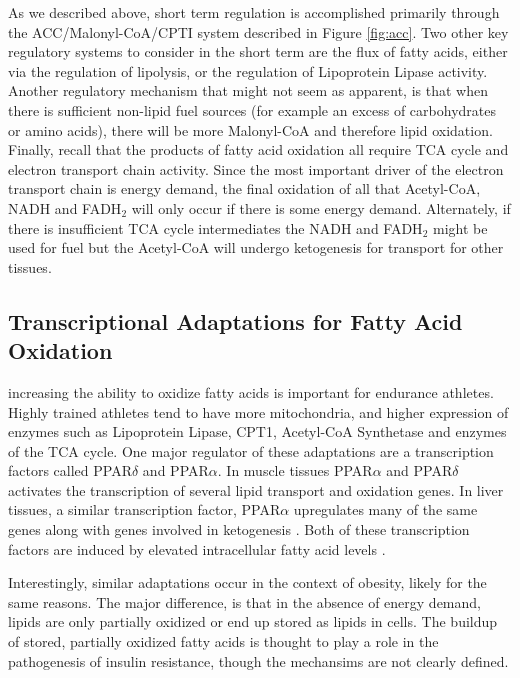 \documentclass{tufte-handout}
\begin{document}
As we described above, short term regulation is accomplished primarily through the ACC/Malonyl-CoA/CPTI system described in Figure \ref{fig:acc}.  Two other key regulatory systems to consider in the short term are the flux of fatty acids, either via the regulation of lipolysis, or the regulation of Lipoprotein Lipase activity.  Another regulatory mechanism that might not seem as apparent, is that when there is sufficient non-lipid fuel sources (for example an excess of carbohydrates or amino acids), there will be more Malonyl-CoA and therefore lipid oxidation.  Finally, recall that the products of fatty acid oxidation all require TCA cycle and electron transport chain activity.  Since the most important driver of the electron transport chain is energy demand, the final oxidation of all that Acetyl-CoA, NADH and FADH$_2$ will only occur if there is some energy demand.   Alternately, if there is insufficient TCA cycle intermediates the NADH and FADH$_2$ might be used for fuel but the Acetyl-CoA will undergo ketogenesis for transport for other tissues.

\subsection{Transcriptional Adaptations for Fatty Acid Oxidation}

 increasing the ability to oxidize fatty acids is important for endurance athletes.  Highly trained athletes tend to have more mitochondria, and higher expression of enzymes such as Lipoprotein Lipase, CPT1, Acetyl-CoA Synthetase and enzymes of the TCA cycle.  One major regulator of these adaptations are a transcription factors called PPAR$\delta$ and PPAR$\alpha$.  In muscle tissues PPAR$\alpha$ and PPAR$\delta$  activates the transcription of several lipid transport and oxidation genes.  In liver tissues, a similar transcription factor, PPAR$\alpha$ upregulates many of the same genes along with genes involved in ketogenesis \citep{Kersten2000,Badman2007}.  Both of these transcription factors are induced by elevated intracellular fatty acid levels \citep{Keller1993}.

Interestingly, similar adaptations occur in the context of obesity, likely for the same reasons.  The major difference, is that in the absence of energy demand, lipids are only partially oxidized or end up stored as lipids in cells.  The buildup of stored, partially oxidized fatty acids is thought to play a role in the pathogenesis of insulin resistance, though the mechansims are not clearly defined.






\end{document}
